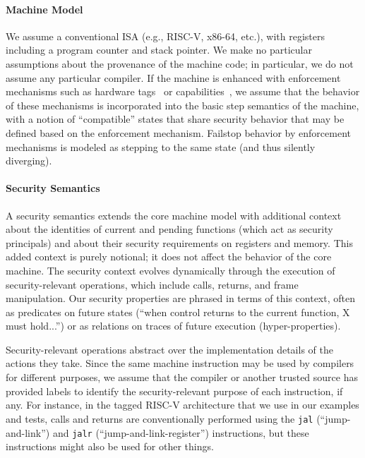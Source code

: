 \documentclass[10pt,conference]{ieeetran}%
\theoremstyle{definition}
\begin{document}
\paragraph*{Machine Model}
We assume a conventional ISA (e.g., RISC-V, x86-64, etc.), with registers including a program counter
and stack pointer.
We make no particular assumptions about the provenance of the machine code; in particular,
we do not assume any particular compiler.
If the machine is enhanced with %
enforcement mechanisms such as hardware
tags~\cite{pump_hasp2014,Gollapudi+23} or
capabilities~\cite{Woodruff+14}, we
assume that the behavior of these mechanisms is incorporated into the basic
step semantics of the machine, with a notion of ``compatible'' states that
share security behavior that may be defined based on the enforcement mechanism.
Failstop behavior by enforcement mechanisms is modeled as stepping to the same state
(and thus silently diverging).

\paragraph*{Security Semantics}
A security semantics extends the core machine model
with additional context about the identities of current and pending
functions (which act as security principals) and about their security
requirements on registers and memory. This added context is purely notional;
it does not affect the behavior of the core machine. The security context
evolves dynamically through the execution of security-relevant operations,
which include calls, returns, and frame manipulation.
Our security properties are phrased in terms of this context, often as predicates
on future states (``when control returns to the current function, X
must hold...'')
or as relations on traces of future execution
(hyper-properties).

Security-relevant operations abstract over the implementation details of the
actions they take. Since the same machine instruction may be used by compilers for
different purposes, we assume that the compiler or another trusted
source has provided
labels to identify the security-relevant purpose of each instruction,
if any. For instance,
in the tagged RISC-V architecture
that we use in our examples and tests,
calls and returns are conventionally performed using the {\tt jal}
(``jump-and-link'')
and {\tt jalr} (``jump-and-link-register'') instructions, but these
instructions might also be used for other things.
\end{document}
